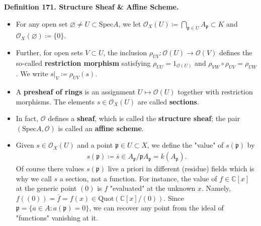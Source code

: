 \documentclass[12pt,a4paper,footinclude=true,headinclude=true]{scrbook} %
\newenvironment{definition}[2][Definition]
    { \begin{mdframed}[backgroundcolor=gray!20] \textbf{#1 #2.}\ }
    {  \end{mdframed}}
\begin{document}
\begin{definition}{171. Structure Sheaf \& Affine Scheme}
    \begin{itemize}
        \item For any open set $\varnothing\neq U\subset\mathrm{Spec}A$, we let $\mathcal{O}_X(U)\coloneqq\bigcap_{\mathfrak{p}\in U}A_\mathfrak{p}\subset K$ and $\mathcal{O}_X(\varnothing)\coloneqq\{0\}$. 
        \item Further, for open sets $V\subset U$, the inclusion $\rho_{UV}:\mathcal{O}(U)\to\mathcal{O}(V)$ defines the so-called \textbf{restriction morphism} satisfying $\rho_{UU}=1_{\mathcal{O}(U)}$ and $\rho_{VW}\circ\rho_{UV}= \rho_{UW}$. We write $s|_V\coloneqq\rho_{UV}(s)$.
        \item A \textbf{presheaf of rings} is an assignment $U\mapsto\mathcal{O} (U)$ together with restriction morphisms. The elements $s\in\mathcal{O}_X(U)$ are called \textbf{sections}.
        \item In fact, $\mathcal{O}$ defines a \textbf{sheaf}, which is called the \textbf{structure sheaf}; the pair $(\mathrm{Spec}A,\mathcal{O})$ is called an \textbf{affine scheme}.
        \item Given $s\in\mathcal{O}_X(U)$ and a point $\mathfrak{p}\in U\subset X$, we define the "value" of $s(\mathfrak{p})$ by 
        \begin{align*}
            s(\mathfrak{p})\coloneqq\overline{s}\in A_\mathfrak{p}/\mathfrak{p}A_\mathfrak{p}=k(A_\mathfrak{p}).
        \end{align*}
        Of course there values $s(\mathfrak{p})$ live a priori in different (residue) fields which is why we call $s$ a section, not a function.
        For instance, the value of $f\in\mathbb{C}[x]$ at the generic point $(0)$ is $f$ "evaluated" at the unknown $x$. Namely, $f((0))=\overline{f}=f(x)\in\mathrm{Quot}(\mathbb{C}[x]/(0))$. Since $\mathfrak{p}=\{a\in A:a(\mathfrak{p})=0\}$, we can recover any point from the ideal of "functions" vanishing at it.
    \end{itemize}
\end{definition}
\end{document}
